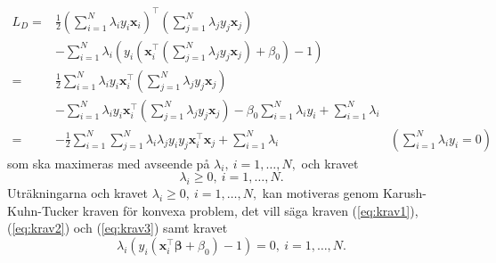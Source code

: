 \documentclass[a4paper, 12pt]{report}
\theoremstyle{definition}
\theoremstyle{remark}
\newcommand{\bfbeta}{{\boldsymbol{\beta}}}
\begin{document}
\begin{equation*}
\begin{aligned}
	L_D=&\frac{1}{2}\left(\sum_{i=1}^{N}\lambda_i y_i \mathbf{x}_i\right)^\intercal \left(\sum_{j=1}^{N}\lambda_j y_j \mathbf{x}_j\right)&\\
	&- \sum_{i=1}^{N}\lambda_i \left(y_i\left(\mathbf{x}_i^\intercal \left(\sum_{j=1}^{N} \lambda_j y_j \mathbf{x}_j\right) +\beta_0 \right) -1\right)&\\
	=& \frac{1}{2} \sum_{i=1}^{N} \lambda_i y_i \mathbf{x}_i^\intercal\left(\sum_{j=1}^{N} \lambda_j y_j \mathbf{x}_j\right) &\\
	&- \sum_{i=1}^{N}\lambda_i y_i \mathbf{x}_i^\intercal \left(\sum_{j=1}^{N} \lambda_j y_j \mathbf{x}_j\right) - \beta_0 \sum_{i=1}^{N} \lambda_i y_i  + \sum_{i=1}^{N} \lambda_i&\\
	=& -\frac{1}{2} \sum_{i=1}^{N} \sum_{j=1}^{N} \lambda_i \lambda_j y_i y_j \mathbf{x}_i^\intercal \mathbf{x}_j + \sum_{i=1}^{N} \lambda_i &\textstyle{\left(\sum\limits_{i=1}^{N}\lambda_iy_i = 0\right)}
\end{aligned}
\end{equation*}
som ska maximeras med avseende på $\lambda_i,~i=1,\dots,N,$ och kravet \begin{equation}\label{eq:krav3}
	\lambda_i\geq 0,~i=1,\dots,N.
\end{equation} Uträkningarna och kravet $\lambda_i\geq 0,~i=1,\dots,N,$ kan motiveras genom Karush-Kuhn-Tucker kraven för konvexa problem, det vill säga kraven (\ref{eq:krav1}), (\ref{eq:krav2}) och (\ref{eq:krav3}) samt kravet
\begin{equation}\label{eq:krav4}
	\lambda_i\left( y_i\left( \mathbf{x}_i^\intercal \bfbeta + \beta_0 \right) -1 \right) = 0,~i=1,\dots, N.
\end{equation}
\end{document}
